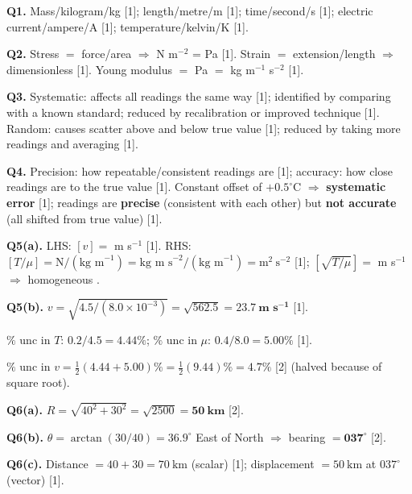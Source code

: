 \begin{markscheme}

\textbf{Q1.} Mass/kilogram/kg [1]; length/metre/m [1]; time/second/s [1]; electric current/ampere/A [1]; temperature/kelvin/K [1].

\vspace{0.5em}\textbf{Q2.} Stress $=$ force/area $\Rightarrow$ N m$^{-2}$ = Pa [1]. Strain $=$ extension/length $\Rightarrow$ dimensionless [1]. Young modulus $=$ Pa $=$ kg m$^{-1}$ s$^{-2}$ [1].

\vspace{0.5em}\textbf{Q3.} Systematic: affects all readings the same way [1]; identified by comparing with a known standard; reduced by recalibration or improved technique [1]. Random: causes scatter above and below true value [1]; reduced by taking more readings and averaging [1].

\vspace{0.5em}\textbf{Q4.} Precision: how repeatable/consistent readings are [1]; accuracy: how close readings are to the true value [1]. Constant offset of $+0.5^\circ$C $\Rightarrow$ \textbf{systematic error} [1]; readings are \textbf{precise} (consistent with each other) but \textbf{not accurate} (all shifted from true value) [1].

\vspace{0.5em}\textbf{Q5(a).} LHS: $[v] = $ m s$^{-1}$ [1]. RHS: $[T/\mu] = \text{N}/(\text{kg m}^{-1}) = \text{kg m s}^{-2}/(\text{kg m}^{-1}) = \text{m}^2\ \text{s}^{-2}$ [1]; $[\sqrt{T/\mu}] = $ m s$^{-1}$ $\Rightarrow$ homogeneous \checkmark [1].

\vspace{0.5em}\textbf{Q5(b).} $v = \sqrt{4.5/(8.0\times10^{-3})} = \sqrt{562.5} = \mathbf{23.7\ \text{m s}^{-1}}$ [1].

$\%$ unc in $T$: $0.2/4.5 = 4.44\%$; $\%$ unc in $\mu$: $0.4/8.0 = 5.00\%$ [1].

$\%$ unc in $v = \tfrac{1}{2}(4.44 + 5.00)\% = \tfrac{1}{2}(9.44)\% = \mathbf{4.7\%}$ [2] (halved because of square root).

\vspace{0.5em}\textbf{Q6(a).} $R = \sqrt{40^2 + 30^2} = \sqrt{2500} = \mathbf{50\ \text{km}}$ [2].

\vspace{0.5em}\textbf{Q6(b).} $\theta = \arctan(30/40) = 36.9^\circ$ East of North $\Rightarrow$ bearing $= \mathbf{037^\circ}$ [2].

\vspace{0.5em}\textbf{Q6(c).} Distance $= 40 + 30 = 70\ \text{km}$ (scalar) [1]; displacement $= 50\ \text{km}$ at $037^\circ$ (vector) [1].


\end{markscheme}
